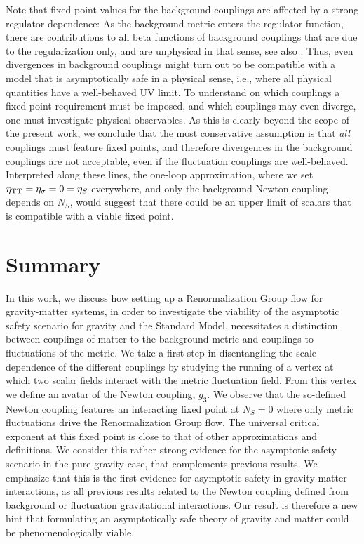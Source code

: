 \documentclass[11pt]{book} %
\numberwithin{equation}{chapter}
\begin{document}
Note that fixed-point values for the background couplings are affected by a strong regulator dependence:
As the background metric enters the regulator function,
there are contributions to all beta functions of background couplings that are due to the regularization only,
and are unphysical in that sense, see also \cite{Folkerts:2011jz, Litim:2002ce, Litim:2002hj, Bridle:2013sra}.
Thus, even divergences in background couplings might turn out to be compatible with a model that
is asymptotically safe in a physical sense, i.e., where all physical quantities have a well-behaved UV limit.
To understand on which couplings a fixed-point requirement must be imposed,
and which couplings may even diverge, one must investigate physical observables.
As this is clearly beyond the scope of the present work, we conclude that the most conservative
assumption is that \emph{all} couplings must feature fixed points,
and therefore divergences in the background couplings are not acceptable,
even if the fluctuation couplings are well-behaved. Interpreted along these lines,
the one-loop approximation, where we set $\eta_{\rm TT}=\eta_{\sigma}=0=\eta_S$ everywhere,
and only the background Newton coupling depends on $N_S$,
would suggest that there could be an upper limit of scalars that is compatible with a viable fixed point.
\newline\\

%
\section{Summary}
%
In this work, we discuss how setting up a Renormalization Group flow for gravity-matter systems,
in order to investigate the viability of the asymptotic safety scenario for gravity and the Standard Model,
necessitates a distinction between couplings of matter to the background metric and couplings to
fluctuations of the metric.
We take a first step in disentangling the scale-dependence of the different couplings by studying
the running of a vertex at which two scalar fields interact with the metric fluctuation field.
From this vertex we define an avatar of the Newton coupling, $g_3$.
We observe that the so-defined Newton coupling features an interacting fixed point at $N_S=0$
where only metric fluctuations drive the Renormalization Group flow.
The universal critical exponent at this fixed point is close to that of other approximations and definitions.
We consider this rather strong evidence for the asymptotic safety scenario  in the pure-gravity case,
that complements previous results.
We emphasize that this is the first evidence for asymptotic-safety in gravity-matter interactions,
as all previous results related to the Newton coupling defined from background or fluctuation
gravitational interactions.
Our result is therefore a new hint that formulating an asymptotically safe theory of gravity
and matter could be phenomenologically viable.\newline
\end{document}
